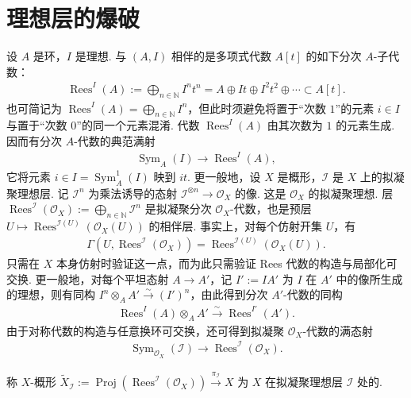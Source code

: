 \section{理想层的爆破}\label{sec:ag-2-2}
\begin{numpara}[Rees 代数]\label{item:ag-2-2-1}
设 $A$ 是环，$I$ 是理想. 与 $(A,I)$ 相伴的是多项式代数 $A[t]$ 的如下分次 $A$-子代数：
\begin{align*}
\operatorname{Rees}^{I}(A):=\bigoplus_{n\in\mathbb N}I^nt^n=A\oplus It\oplus I^2t^2\oplus\cdots\subset A[t].
\end{align*}
也可简记为 $\operatorname{Rees}^{I}(A)=\bigoplus_{n\in\mathbb N}I^n$，但此时须避免将置于``次数 $1$''的元素 $i\in I$ 与置于``次数 $0$''的同一个元素混淆. 代数 $\operatorname{Rees}^{I}(A)$ 由其次数为 $1$ 的元素生成. 因而有分次 $A$-代数的典范满射
\begin{align*}
\operatorname{Sym}_A(I)\longrightarrow\operatorname{Rees}^{I}(A),
\end{align*}
它将元素 $i\in I=\operatorname{Sym}_A^1(I)$ 映到 $it$.
更一般地，设 $X$ 是概形，$\mathcal I$ 是 $X$ 上的拟凝聚理想层. 记 $\mathcal I^n$ 为乘法诱导的态射 $\mathcal I^{\otimes n}\longrightarrow\mathcal O_X$ 的像. 这是 $\mathcal O_X$ 的拟凝聚理想. 层 $\operatorname{Rees}^{\mathcal I}(\mathcal O_X):=\bigoplus_{n\in\mathbb N}\mathcal I^n$ 是拟凝聚分次 $\mathcal O_X$-代数，也是预层 $U\mapsto\operatorname{Rees}^{\mathcal I(U)}(\mathcal O_X(U))$ 的相伴层. 事实上，对每个仿射开集 $U$，有
\begin{align*}
\Gamma(U,\operatorname{Rees}^{\mathcal I}(\mathcal O_X))=\operatorname{Rees}^{\mathcal I(U)}(\mathcal O_X(U)).
\end{align*}
只需在 $X$ 本身仿射时验证这一点，而为此只需验证 Rees 代数的构造与局部化可交换. 更一般地，对每个平坦态射 $A\longrightarrow A'$，记 $I':=IA'$ 为 $I$ 在 $A'$ 中的像所生成的理想，则有同构 $I^n\otimes_AA'\xrightarrow\sim(I')^n$，由此得到分次 $A'$-代数的同构
\begin{align*}
\operatorname{Rees}^{I}(A)\otimes_AA'\xrightarrow\sim\operatorname{Rees}^{I'}(A').
\end{align*}
由于对称代数的构造与任意换环可交换，还可得到拟凝聚 $\mathcal O_X$-代数的满态射
\begin{align*}
\operatorname{Sym}_{\mathcal O_X}(\mathcal I)\longrightarrow\operatorname{Rees}^{\mathcal I}(\mathcal O_X).
\end{align*}
\end{numpara}
\begin{definition}\label{item:ag-2-2-2}
称 $X$-概形 $\widetilde X_{\mathcal I}:=\operatorname{Proj}(\operatorname{Rees}^{\mathcal I}(\mathcal O_X))\xrightarrow{\pi_{\mathcal I}}X$ 为 $X$ 在拟凝聚理想层 $\mathcal I$ 处的.
\end{definition}
